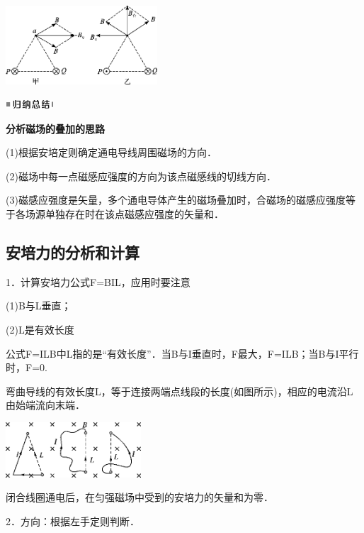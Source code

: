 \documentclass[cn,10.5pt,chinese,mac,chinesefont=founder]{elegantbook}
\begin{document}
\begin{center}\includegraphics[width=2.22639in,height=1.16042in]{media/image340.png}\end{center}
\begin{center}\includegraphics[width=0.70764in,height=0.12292in]{media/image13.png}\end{center}
\begin{center}
	\textbf{分析磁场的叠加的思路}
\end{center}

(1)根据安培定则确定通电导线周围磁场的方向．

(2)磁场中每一点磁感应强度的方向为该点磁感线的切线方向．

(3)磁感应强度是矢量，多个通电导体产生的磁场叠加时，合磁场的磁感应强度等于各场源单独存在时在该点磁感应强度的矢量和．

\newpage
\subsection{安培力的分析和计算}
1．计算安培力公式F=BIL，应用时要注意

(1)B与L垂直；

(2)L是有效长度

公式F=ILB中L指的是``有效长度''．当B与I垂直时，F最大，F=ILB；当B与I平行时，F=0.

弯曲导线的有效长度L，等于连接两端点线段的长度(如图所示)，相应的电流沿L由始端流向末端．

\begin{center}\includegraphics[width=1.99028in,height=0.81111in]{media/image341.png}\end{center}

闭合线圈通电后，在匀强磁场中受到的安培力的矢量和为零．

2．方向：根据左手定则判断．
\end{document}
